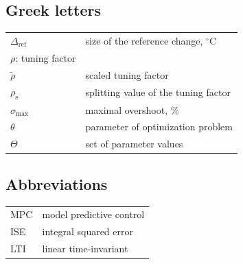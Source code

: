 \documentclass[preprint,12pt]{elsarticle}
\begin{document}
\subsection{Greek letters}
\begin{center}
	\begin{tabular}{ l l }
		$\Delta_\mathrm{ref}$ & size of the reference change, $^{\circ}\mathrm{C}$ \\
		$\rho$:	tuning factor \\
		$\widetilde{\rho}$ & scaled tuning factor \\
		$\rho_{\mathrm{s}}$ & splitting value of the tuning factor \\
		$\sigma_{\max}$ & maximal overshoot, \% \\
		$\theta$ & parameter of optimization problem \\
		$\Theta$ & set of parameter values
	\end{tabular}
\end{center}

\subsection*{Abbreviations}
\begin{center}
	\begin{tabular}{ l l }
		MPC & model predictive control \\
		ISE & integral squared error \\
		LTI & linear time-invariant \\
	\end{tabular}
\end{center}




 



%
%
%
\end{document}
